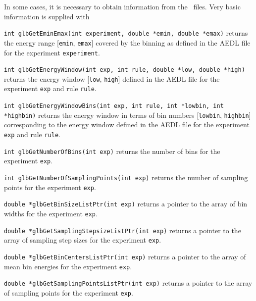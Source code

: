 In some cases, it is necessary to obtain information from the \AEDL\
files. Very basic information is supplied with
\begin{function}
{\tt int glbGetEminEmax(int experiment, double *emin, double *emax)} returns the
energy range [{\tt emin}, {\tt emax}] covered by the binning as defined in the AEDL file for the experiment
{\tt experiment}.
\end{function}
\begin{function}
{\tt int glbGetEnergyWindow(int exp, int rule, double *low, double *high)} returns the
energy window [{\tt low}, {\tt high}] defined in the AEDL file for the experiment
{\tt exp} and rule {\tt rule}.
\end{function}
\begin{function}
{\tt int glbGetEnergyWindowBins(int exp, int rule, int *lowbin, int *highbin)} returns the
energy window in terms of bin numbers [{\tt lowbin}, {\tt highbin}] corresponding to the energy window defined in the AEDL file for the experiment {\tt exp} and rule {\tt rule}.
\end{function}
\begin{function}
{\tt int glbGetNumberOfBins(int exp)} returns the number of bins for the experiment {\tt exp}.
\end{function}
\begin{function}
{\tt int glbGetNumberOfSamplingPoints(int exp)} returns the number of sampling points for the experiment {\tt exp}.
\end{function}
\begin{function}
{\tt double *glbGetBinSizeListPtr(int exp)} returns a pointer to the array of bin widths
for the experiment {\tt exp}.
\end{function}
\begin{function}
{\tt double *glbGetSamplingStepsizeListPtr(int exp)} returns a pointer to the array of
sampling step sizes for the experiment {\tt exp}.
\end{function}
\begin{function}
{\tt double *glbGetBinCentersListPtr(int exp)} returns a pointer to the array of
mean bin energies for the experiment {\tt exp}.
\end{function}
\begin{function}
{\tt double *glbGetSamplingPointsListPtr(int exp)} returns a pointer to the array of
sampling points for the experiment {\tt exp}.
\end{function}

